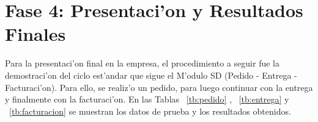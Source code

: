 \section{Fase 4: Presentaci'on y Resultados Finales}
	Para la presentaci'on final en la empresa, el procedimiento a seguir fue la demostraci'on del ciclo est'andar que sigue el M'odulo SD (Pedido - Entrega - Facturaci'on). Para ello, se realiz'o un pedido, para luego continuar con la entrega y finalmente con la facturaci'on. En las Tablas ~\ref{tb:pedido} , ~\ref{tb:entrega} y ~\ref{tb:facturacion} se muestran los datos de prueba y los resultados obtenidos. 